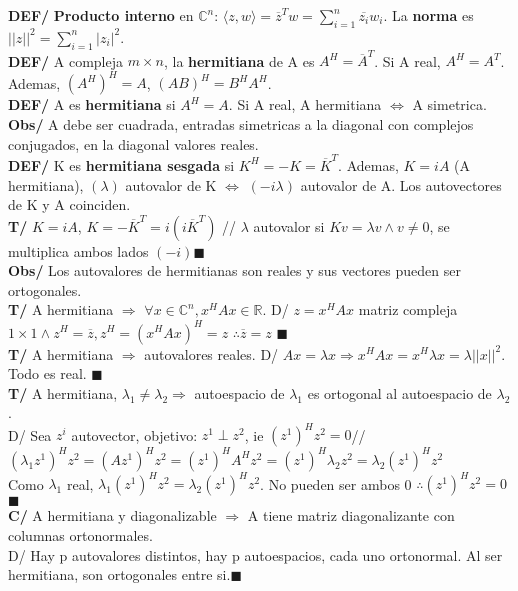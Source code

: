 \documentclass[10pt,a4paper]{article}
\newcommand*{\QEDA}{\null\nobreak\hfill\ensuremath{\blacksquare}}
\begin{document}
\textbf{DEF/} \textbf{Producto interno} en $\mathbb{C}^n$: $\langle z,w \rangle = \overline{z}^Tw = \sum_{i=1}^n \overline{z_i}w_i$. La \textbf{norma} es $||z||^2 = \sum_{i=1}^n |z_i|^2$.\\
\textbf{DEF/} A compleja $m \times n$, la \textbf{hermitiana} de A es $A^H=\overline{A}^T$. Si A real, $A^H=A^T$. Ademas, $(A^H)^H=A$, $(AB)^H=B^HA^H$.\\
\textbf{DEF/} A es \textbf{hermitiana} si $A^H=A$. Si A real, A hermitiana $\iff$ A simetrica.\\
\textbf{Obs/} A debe ser cuadrada, entradas simetricas a la diagonal con complejos conjugados, en la diagonal valores reales.\\
\textbf{DEF/} K es \textbf{hermitiana sesgada} si $K^H=-K=\overline{K}^T$. Ademas, $K=iA$ (A hermitiana), $(\lambda)$ autovalor de K $\iff$ $(-i\lambda)$ autovalor de A. Los autovectores de K y A coinciden.\\
\textbf{T/} $K=iA$, $K=-\overline{K}^T = i(i\overline{K}^T)$ // $\lambda$ autovalor si $Kv=\lambda v \land v\not=0$, se multiplica ambos lados $(-i)$\QEDA\\
\textbf{Obs/} Los autovalores de hermitianas son reales y sus vectores pueden ser ortogonales.\\
\textbf{T/} A hermitiana $\Rightarrow$ $\forall x \in \mathbb{C}^n, x^HAx \in \mathbb{R}$. D/ $z=x^HAx$ matriz compleja $1 \times 1 \land z^H=\overline{z}, z^H = (x^HAx)^H=z$ $\therefore \overline{z}=z$ \QEDA\\
\textbf{T/} A hermitiana $\Rightarrow$ autovalores reales. D/ $Ax=\lambda x \Rightarrow x^HAx = x^H\lambda x = \lambda ||x||^2$. Todo es real. \QEDA\\
\textbf{T/} A hermitiana, $\lambda_1 \not = \lambda_2 \Rightarrow$ autoespacio de $\lambda_1$ es ortogonal al autoespacio de $\lambda_2$.\\
D/ Sea $z^i$ autovector, objetivo: $z^1 \perp z^2$, ie $(z^1)^Hz^2=0$// $(\lambda_1z^1)^Hz^2=(Az^1)^Hz^2=(z^1)^HA^Hz^2=(z^1)^H\lambda_2z^2 = \lambda_2(z^1)^Hz^2$\\Como $\lambda_1$ real, $\lambda_1(z^1)^Hz^2 = \lambda_2(z^1)^Hz^2$. No pueden ser ambos 0 $\therefore (z^1)^Hz^2 = 0$ \QEDA\\
\textbf{C/} A hermitiana y diagonalizable $\Rightarrow$ A tiene matriz diagonalizante con columnas ortonormales.\\
D/ Hay p autovalores distintos, hay p autoespacios, cada uno ortonormal. Al ser hermitiana, son ortogonales entre si.\QEDA\\
\end{document}
